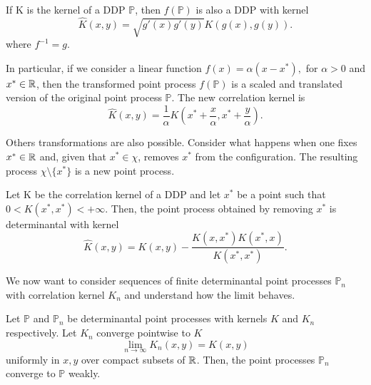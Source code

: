 \begin{prop} \cite{ManuelaGirottiPhD}
	If K is the kernel of a DDP $\mathbb{P}$, then $f(\mathbb{P})$ is also a DDP with kernel
	\begin{equation}
		\hat{K}(x, y) = \sqrt{g'(x) g'(y)} K(g(x), g(y)).
	\end{equation}
	where $f^{-1} = g$.
\end{prop}

In particular, if we consider a linear function $f(x) = \alpha (x - x^*),$ for $\alpha > 0$ and $x^* \in \mathbb{R}$, then the transformed point process $f(\mathbb{P})$ is a scaled and translated version of the original point process $\mathbb{P}$. The new correlation kernel is
\begin{equation}
	\hat{K}(x, y) = \frac{1}{\alpha} K\left(x^* + \frac{x}{\alpha}, x^* + \frac{y}{\alpha}\right).
\end{equation}

Others transformations are also possible. Consider what happens when one fixes $x^* \in \mathbb{R}$ and, given that $x^* \in \chi$, removes $x^*$ from the configuration. The resulting process $\chi \setminus \{x^*\}$ is a new point process.
 
 \begin{prop} \cite{ManuelaGirottiPhD}
 		Let K be the correlation kernel of a DDP and let $x^*$ be a point such that $0 < K(x^*, x^*) < + \infty$. Then, the point process obtained by removing $x^*$ is determinantal with kernel
 		\begin{equation}
 			\hat{K}(x, y) = K(x, y) - \frac{K(x, x^*) K(x^*, x)}{K(x^*, x^*)}.
 		\end{equation}
 \end{prop}
 
 We now want to consider sequences of finite determinantal point processes $\mathbb{P}_n$ with correlation kernel $K_n$ and understand how the limit behaves. 
 
 \begin{prop} \cite{ManuelaGirottiPhD}
	Let $\mathbb{P}$ and $\mathbb{P}_n$ be determinantal point processes with kernels $K$ and $K_n$ respectively. Let $K_n$ converge pointwise to $K$
	\begin{equation}
		\lim_{n \rightarrow \infty} K_n(x, y) = K(x, y)
	\end{equation}
	uniformly in $x, y$ over compact subsets of $\mathbb{R}$. Then, the point processes $\mathbb{P}_n$ converge to $\mathbb{P}$ weakly. 
 \end{prop}


